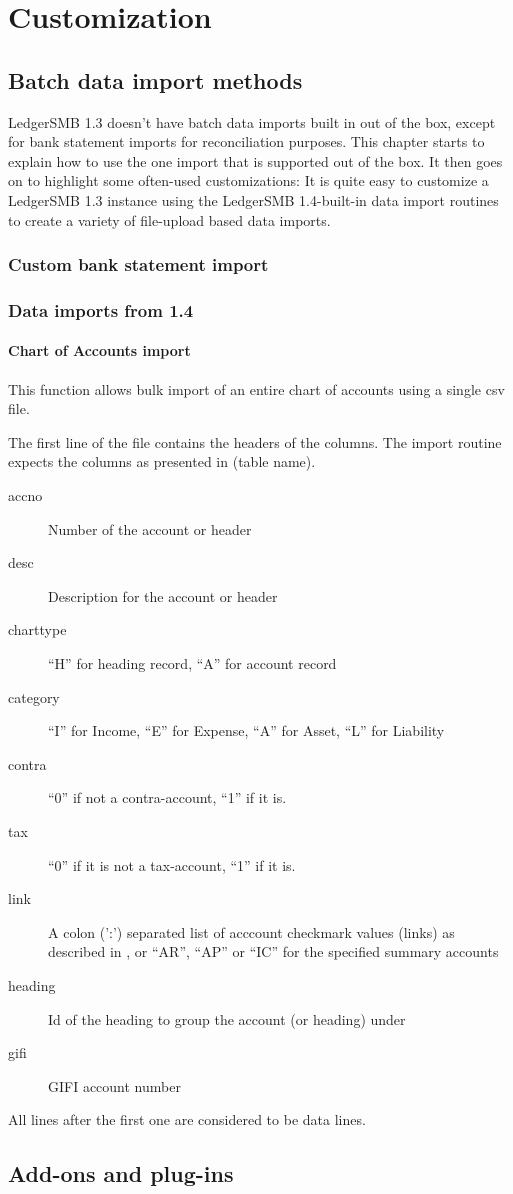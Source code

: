 


\part{Customization}
\label{part:Customization}

\chapter{Batch data import methods}

LedgerSMB 1.3 doesn't have batch data imports built in out of the box,
except for bank statement imports for reconciliation purposes. This
chapter starts to explain how to use the one import that is supported
out of the box. It then goes on to highlight some often-used customizations: 
It is quite easy to customize a LedgerSMB 1.3 instance using
the LedgerSMB 1.4-built-in data import routines to create a variety
of file-upload based data imports.

\section{Custom bank statement import}


\section{Data imports from 1.4}

\subsection{Chart of Accounts import}

This function allows bulk import of an entire chart of accounts using a
single \gls{csv} file.

The first line of the file contains the headers of the columns. The
import routine expects the columns as presented in (table name).

\begin{description}
\item [accno] Number of the account or header
\item [desc] Description for the account or header
\item [charttype] ``H'' for heading record, ``A'' for account record
\item [category] ``I'' for Income, ``E'' for Expense, ``A'' for Asset, ``L'' for Liability
\item [contra] ``0'' if not a contra-account, ``1'' if it is.
\item [tax] ``0'' if it is not a tax-account, ``1'' if it is.
\item [link] A colon (':') separated list of acccount checkmark values (links) as described
    in , or ``AR'', ``AP'' or ``IC'' for the specified summary accounts
\item [heading] Id of the heading to group the account (or heading) under
\item [gifi] GIFI account number
\end{description}

All lines after the first one are considered to be data lines.

\chapter{Add-ons and plug-ins}

